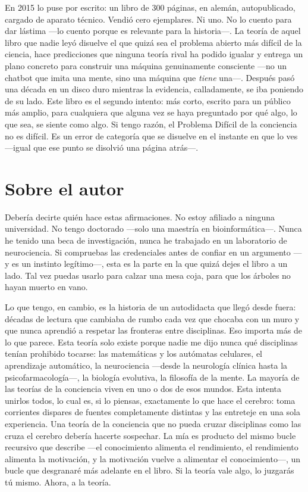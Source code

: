 \documentclass[11pt, twoside, openright]{book}
\begin{document}
En 2015 lo puse por escrito: un libro de 300 páginas, en alemán, autopublicado, cargado de aparato técnico. Vendió cero ejemplares. Ni uno. No lo cuento para dar lástima ---lo cuento porque es relevante para la historia---. La teoría de aquel libro que nadie leyó disuelve el que quizá sea el problema abierto más difícil de la ciencia, hace predicciones que ninguna teoría rival ha podido igualar y entrega un plano concreto para construir una máquina genuinamente consciente ---no un chatbot que imita una mente, sino una máquina que \textit{tiene} una---. Después pasó una década en un disco duro mientras la evidencia, calladamente, se iba poniendo de su lado. Este libro es el segundo intento: más corto, escrito para un público más amplio, para cualquiera que alguna vez se haya preguntado por qué algo, lo que sea, se siente como algo. Si tengo razón, el Problema Difícil de la conciencia no es difícil. Es un error de categoría que se disuelve en el instante en que lo ves ---igual que ese punto se disolvió una página atrás---.


\chapter*{Sobre el autor}

Debería decirte quién hace estas afirmaciones. No estoy afiliado a ninguna universidad. No tengo doctorado ---solo una maestría en bioinformática---. Nunca he tenido una beca de investigación, nunca he trabajado en un laboratorio de neurociencia. Si compruebas las credenciales antes de confiar en un argumento ---y es un instinto legítimo---, esta es la parte en la que quizá dejes el libro a un lado. Tal vez puedas usarlo para calzar una mesa coja, para que los árboles no hayan muerto en vano.

Lo que tengo, en cambio, es la historia de un autodidacta que llegó desde fuera: décadas de lectura que cambiaba de rumbo cada vez que chocaba con un muro y que nunca aprendió a respetar las fronteras entre disciplinas. Eso importa más de lo que parece. Esta teoría solo existe porque nadie me dijo nunca qué disciplinas tenían prohibido tocarse: las matemáticas y los autómatas celulares, el aprendizaje automático, la neurociencia ---desde la neurología clínica hasta la psicofarmacología---, la biología evolutiva, la filosofía de la mente. La mayoría de las teorías de la conciencia viven en uno o dos de esos mundos. Esta intenta unirlos todos, lo cual es, si lo piensas, exactamente lo que hace el cerebro: toma corrientes dispares de fuentes completamente distintas y las entreteje en una sola experiencia. Una teoría de la conciencia que no pueda cruzar disciplinas como las cruza el cerebro debería hacerte sospechar. La mía es producto del mismo bucle recursivo que describe ---el conocimiento alimenta el rendimiento, el rendimiento alimenta la motivación, y la motivación vuelve a alimentar el conocimiento---, un bucle que desgranaré más adelante en el libro. Si la teoría vale algo, lo juzgarás tú mismo. Ahora, a la teoría.
\end{document}
